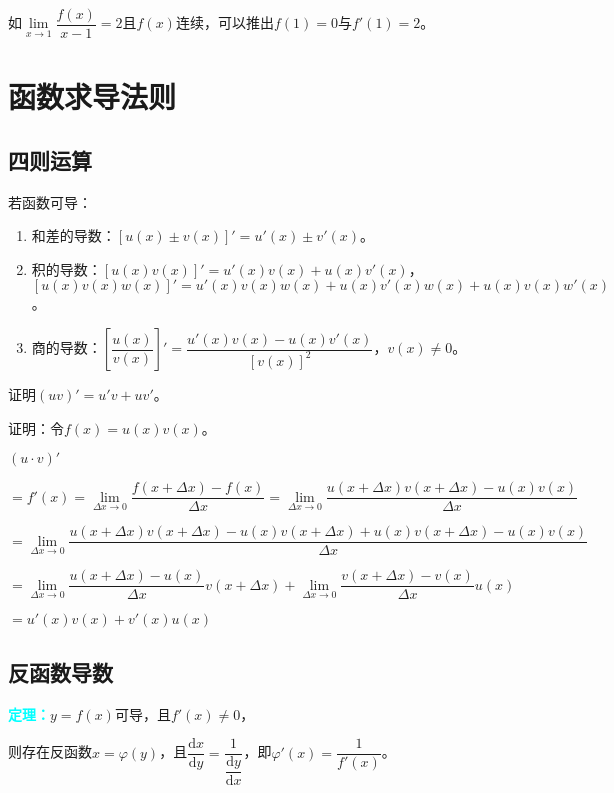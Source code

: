 \documentclass[UTF8, 12pt]{ctexart}
\begin{document}
        如$\lim\limits_{x\to 1}\dfrac{f(x)}{x-1}=2$且$f(x)$连续，可以推出$f(1)=0$与$f'(1)=2$。

        \section{函数求导法则}

        \subsection{四则运算}

        若函数可导：

        \begin{enumerate}
            \item 和差的导数：$[u(x)\pm v(x)]'=u'(x)\pm v'(x)$。
            \item 积的导数：$[u(x)v(x)]'=u'(x)v(x)+u(x)v'(x)$，\\ $[u(x)v(x)w(x)]'=u'(x)v(x)w(x)+u(x)v'(x)w(x)+u(x)v(x)w'(x)$。
            \item 商的导数：$\left[\dfrac{u(x)}{v(x)}\right]'=\dfrac{u'(x)v(x)-u(x)v'(x)}{[v(x)]^2}$，$v(x)\neq 0$。
        \end{enumerate}

        证明$(uv)'=u'v+uv'$。

        证明：令$f(x)=u(x)v(x)$。

        $(u\cdot v)'$

        $=f'(x)=\lim\limits_{\Delta x\to 0}\dfrac{f(x+\Delta x)-f(x)}{\Delta x}=\lim\limits_{\Delta x\to 0}\dfrac{u(x+\Delta x)v(x+\Delta x)-u(x)v(x)}{\Delta x}$

        $=\lim\limits_{\Delta x\to 0}\dfrac{u(x+\Delta x)v(x+\Delta x)-u(x)v(x+\Delta x)+u(x)v(x+\Delta x)-u(x)v(x)}{\Delta x}$

        $=\lim\limits_{\Delta x\to 0}\dfrac{u(x+\Delta x)-u(x)}{\Delta x}v(x+\Delta x) +\lim\limits_{\Delta x\to 0}\dfrac{v(x+\Delta x)-v(x)}{\Delta x}u(x)$

        $=u'(x)v(x)+v'(x)u(x)$

        \subsection{反函数导数}

        \textcolor{aqua}{\textbf{定理：}}$y=f(x)$可导，且$f'(x)\neq 0$，

        则存在反函数$x=\varphi(y)$，且$\dfrac{\textrm{d}x}{\textrm{d}y}=\dfrac{1}{\dfrac{\textrm{d}y}{\textrm{d}x}}$，即$\varphi'(x)=\dfrac{1}{f'(x)}$。\medskip
\end{document}
